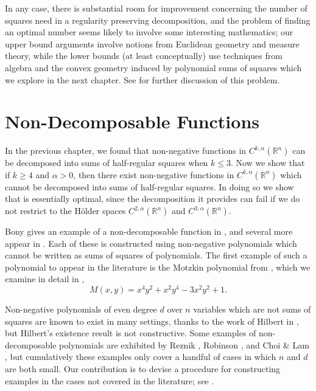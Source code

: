 \documentclass[oneside,hidelinks,indentfirst,10pt]{book}
\begin{document}
In any case, there is substantial room for improvement concerning the number of squares need in a regularity preserving decomposition, and the problem of finding an optimal number seems likely to involve some interesting mathematics; our upper bound arguments involve notions from Euclidean geometry and measure theory, while the lower bounds (at least conceptually) use techniques from algebra and the convex geometry induced by polynomial sums of squares which we explore in the next chapter. See  for further discussion of this problem.
\chapter{Non-Decomposable Functions}\label{chap:poly}


In the previous chapter, we found that non-negative functions in \(C^{k,\alpha}(\mathbb{R}^n)\) can be decomposed into sums of half-regular squares when \(k\leq 3\). Now we show that if \(k\geq 4\) and \(\alpha>0\), then there exist non-negative functions in \(C^{k,\alpha}(\mathbb{R}^n)\) which cannot be decomposed into sums of half-regular squares. In doing so we show that  is essentially optimal, since the decomposition it provides can fail if we do not restrict to the H\"older spaces \(C^{2,\alpha}(\mathbb{R}^n)\) and \(C^{3,\alpha}(\mathbb{R}^n)\). 


Bony gives an example of a non-decomposable function in \cite{Bony}, and several more appear in \cite{SOS_I}. Each of these is constructed using non-negative polynomials which cannot be written as sums of squares of polynomials. The first example of such a polynomial to appear in the literature is the Motzkin polynomial from \cite{Motzkin}, which we examine in detail in ,
\[
    M(x,y)=x^4y^2+x^2y^4-3x^2y^2+1.
\]

Non-negative polynomials of even degree \(d\) over \(n\) variables which are not sums of squares are known to exist in many settings, thanks to the work of Hilbert in \cite{Hilbert}, but Hilbert's existence result is not constructive. Some examples of non-decomposable polynomials are exhibited by Reznik \cite{reznik_extpsd}, Robinson \cite{robinson}, and Choi \& Lam \cite{CL2}, but cumulatively these examples only cover a handful of cases in which \(n\) and \(d\) are both small. Our contribution is to devise a procedure for constructing examples in the cases not covered in the literature; see .
\end{document}
